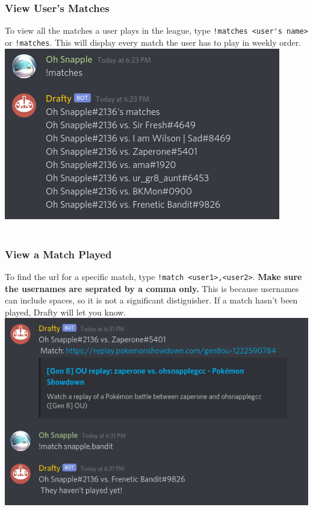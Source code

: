 \documentclass{article}
\begin{document}
\subsubsection*{View User's Matches}
To view all the matches a user plays in the league, type \verb|!matches <user's name>| or \verb|!matches|. 
This will display every match the user has to play in weekly order.\\
\includegraphics[scale=.5]{matches.png}
\\\\
\subsubsection*{View a Match Played}
To find the url for a specific match, type \verb|!match <user1>,<user2>|. \textbf{Make sure the usernames are seprated by a comma only.} 
This is because usernames can include spaces, so it is not a significant distiguisher. If a match hasn't been played, Drafty will let you know.\\
\includegraphics[scale=.5]{match_played.png}
\newpage
\end{document}
